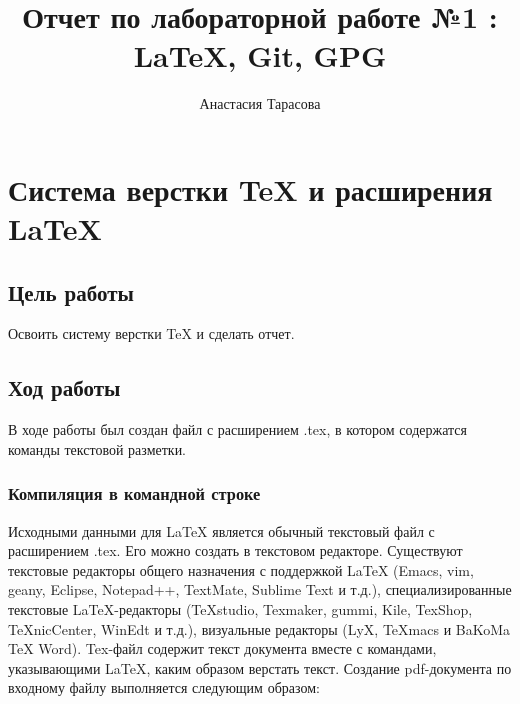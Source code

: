 \documentclass[12pt,a4paper]{article}
\author{Анастасия Тарасова}
\title{Отчет по лабораторной работе №1 :\\ \LaTeX{}, Git, GPG}
\begin{document}
\maketitle
\section{Система верстки \TeX{} и расширения \LaTeX{}}
\subsection{Цель работы}
Освоить систему верстки \TeX{} и сделать отчет.
\subsection{Ход работы}
В ходе работы был создан файл с расширением .tex, в котором содержатся команды текстовой разметки.
\subsubsection{Компиляция в командной строке}
Исходными данными для \LaTeX{} является обычный текстовый файл с расширением .tex. Его можно создать в текстовом редакторе. Существуют текстовые редакторы общего назначения с поддержкой \LaTeX{} (Emacs, vim, geany, Eclipse, Notepad++, TextMate, Sublime Text и т.д.), специализированные текстовые LaTeX-редакторы (TeXstudio, Texmaker, gummi, Kile, TexShop, TeXnicCenter, WinEdt и т.д.), визуальные редакторы (LyX, TeXmacs и BaKoMa TeX Word).  Tex-файл содержит текст документа вместе с командами, указывающими \LaTeX{}, каким образом верстать текст.
Создание pdf-документа по входному файлу выполняется следующим образом:
\end{document}
